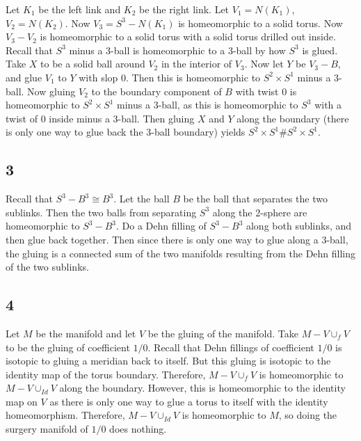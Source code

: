 \documentclass{article}
\theoremstyle{definition}
\numberwithin{theorem}{section}
\numberwithin{equation}{section}
\begin{document}
Let $K_1$ be the left link and $K_2$ be the right link. Let $V_1 = N(K_1)$, $V_2 = N(K_2)$. Now $V_3 = S^3 - N(K_1)$ is homeomorphic to a solid torus. Now $V_3 - V_2$ is homeomorphic to a solid torus with a solid torus drilled out inside. Recall that $S^3$ minus a 3-ball is homeomorphic to a 3-ball by how $S^3$ is glued. Take $X$ to be a solid ball around $V_2$ in the interior of $V_3$. Now let $Y$ be $V_3 - B$, and glue $V_1$ to $Y$ with slop $0$. Then this is homeomorphic to $S^2 \times S^1$ minus a $3$-ball. Now gluing $V_2$ to the boundary component of $B$ with twist 0 is homeomorphic to $S^2 \times S^1$ minus a $3$-ball, as this is homeomorphic to $S^3$ with a twist of $0$ inside minus a $3$-ball. Then gluing $X$ and $Y$ along the boundary (there is only one way to glue back the 3-ball boundary) yields $S^2 \times S^1 \# S^2 \times S^1$. 

\subsection{3}
Recall that $S^3 - B^3 \cong B^3$. Let the ball $B$ be the ball that separates the two sublinks. Then the two balls from separating $S^3$ along the 2-sphere are homeomorphic to $S^3 - B^3$. Do a Dehn filling of $S^3 - B^3$ along both sublinks, and then glue back together. Then since there is only one way to glue along a 3-ball, the gluing is a connected sum of the two manifolds resulting from the Dehn filling of the two sublinks. 

\subsection{4}
Let $M$ be the manifold and let $V$ be the gluing of the manifold. Take $M - V \cup_f V$ to be the gluing of coefficient $1/0$. 
Recall that Dehn fillings of coefficient $1/0$ is isotopic to gluing a meridian back to itself. But this gluing is isotopic to the identity map of the torus boundary. Therefore, $M - V \cup_f V$ is homeomorphic to $M - V \cup_{Id} V$ along the boundary. However, this is homeomorphic to the identity map on $V$ as there is only one way to glue a torus to itself with the identity homeomorphism. Therefore, $M - V \cup_{Id} V$ is homeomorphic to $M$, so doing the surgery manifold of $1/0$ does nothing. 
\end{document}

